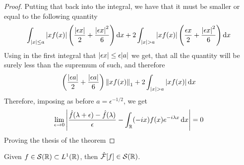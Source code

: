 \documentclass[../complete.tex]{subfiles}
\begin{document}
\begin{proof}
	Putting that back into the integral, we have that it must be smaller or equal to the following quantity
	\begin{equation*}
		\int_{\abs{x}\le a}^{}\abs{xf(x)}\left( \frac{\abs{\epsilon x}}{2}+\frac{\abs{\epsilon x}^2}{6} \right)\diff x+2\int_{\abs{x}>a}^{}\abs{xf(x)}\left( \frac{\epsilon x}{2}+\frac{\abs{\epsilon x}^2}{6} \right)\diff x
	\end{equation*}
	Using in the first integral that $\abs{\epsilon x}\le\epsilon\abs{a}$ we get, that all the quantity will be surely less than the supremum of such, and therefore
	\begin{equation*}
		\left( \frac{\abs{\epsilon a}}{2}+\frac{\abs{\epsilon a}}{6} \right)\pnorm[1]{xf(x)}+2\int_{\abs{x}>a}^{}\abs{xf(x)}\diff x
	\end{equation*}
	Therefore, imposing as before $a=\epsilon^{-1/2}$, we get
	\begin{equation*}
		\lim_{\epsilon\to0}\abs{\frac{\hat{f}(\lambda+\epsilon)-\hat{f}(\lambda)}{\epsilon}-\int_{\R}^{}(-ix)f(x)e^{-i\lambda x}\diff x}=0
	\end{equation*}
	Proving the thesis of the theorem
\end{proof}
\begin{thm}
	Given $f\in\Sp(\R)\subset L^1(\R)$, then $\fou[f]\in\Sp(\R)$.
\end{thm}
\end{document}
